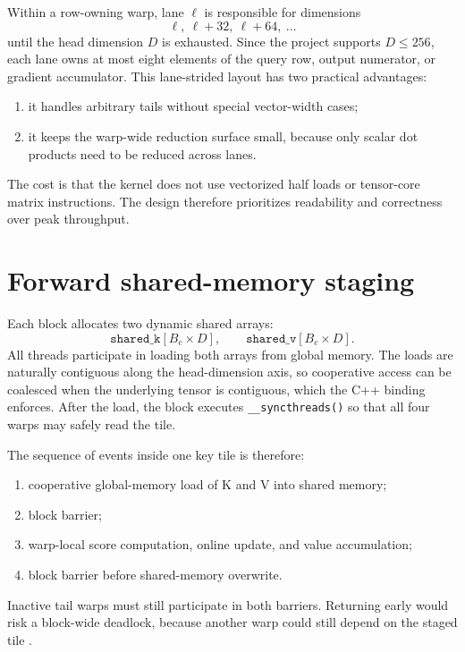 Within a row-owning warp, lane $\ell$ is responsible for dimensions
\begin{equation}
  \ell,\ \ell+32,\ \ell+64,\ \ldots
\end{equation}
until the head dimension $D$ is exhausted. Since the project supports $D\le256$, each lane owns at most eight elements of the query row, output numerator, or gradient accumulator. This lane-strided layout has two practical advantages:
\begin{enumerate}
  \item it handles arbitrary tails without special vector-width cases;
  \item it keeps the warp-wide reduction surface small, because only scalar dot products need to be reduced across lanes.
\end{enumerate}

The cost is that the kernel does not use vectorized half loads or tensor-core matrix instructions. The design therefore prioritizes readability and correctness over peak throughput.

\section{Forward shared-memory staging}

Each block allocates two dynamic shared arrays:
\begin{equation}
  \texttt{shared\_k}[B_c \times D],
  \qquad
  \texttt{shared\_v}[B_c \times D].
\end{equation}
All threads participate in loading both arrays from global memory. The loads are naturally contiguous along the head-dimension axis, so cooperative access can be coalesced when the underlying tensor is contiguous, which the C++ binding enforces. After the load, the block executes \texttt{\_\_syncthreads()} so that all four warps may safely read the tile.

The sequence of events inside one key tile is therefore:
\begin{enumerate}
  \item cooperative global-memory load of K and V into shared memory;
  \item block barrier;
  \item warp-local score computation, online update, and value accumulation;
  \item block barrier before shared-memory overwrite.
\end{enumerate}

Inactive tail warps must still participate in both barriers. Returning early would risk a block-wide deadlock, because another warp could still depend on the staged tile \citep{nvidia2026programming}.

